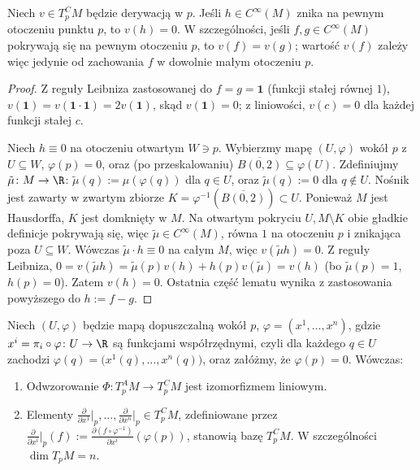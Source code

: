 \begin{lemat}\label{lem:lokalnosc}
Niech $v\in T_p^CM$ będzie derywacją w $p$. Jeśli $h\in C^\infty(M)$ znika na pewnym
otoczeniu punktu $p$, to $v(h)=0$. W szczególności, jeśli $f,g\in C^\infty(M)$ pokrywają
się na pewnym otoczeniu $p$, to $v(f)=v(g)$; wartość $v(f)$ zależy więc jedynie od
zachowania $f$ w dowolnie małym otoczeniu $p$.
\end{lemat}
\begin{proof}
Z reguły Leibniza zastosowanej do $f=g=\mathbf1$ (funkcji stałej równej $1$),
$v(\mathbf1)=v(\mathbf1\cdot\mathbf1)=2v(\mathbf1)$, skąd $v(\mathbf1)=0$; z liniowości,
$v(c)=0$ dla każdej funkcji stałej $c$.

Niech $h\equiv0$ na otoczeniu otwartym $W\ni p$. Wybierzmy mapę $(U,\varphi)$ wokół $p$ z
$U\subseteq W$, $\varphi(p)=0$, oraz (po przeskalowaniu)
$\overline{B(0,2)}\subseteq\varphi(U)$.
Zdefiniujmy $\tilde\mu\colon M\to\R$: $\tilde\mu(q):=\mu(\varphi(q))$ dla $q\in U$, oraz
$\tilde\mu(q):=0$ dla $q\notin U$. Nośnik jest zawarty w zwartym
zbiorze $K=\varphi^{-1}(\overline{B(0,2)})\subset U$.
Ponieważ $M$ jest Hausdorffa, $K$ jest domknięty w $M$.
Na otwartym pokryciu $U, M\setminus K$ obie gładkie definicje
pokrywają się, więc $\tilde\mu\in C^\infty(M)$, równa $1$ na otoczeniu $p$ i znikająca poza
$U\subseteq W$. Wówczas $\tilde\mu\cdot h\equiv0$ na całym $M$, więc $v(\tilde\mu h)=0$.
Z reguły Leibniza, $0=v(\tilde\mu h)=\tilde\mu(p)v(h)+h(p)v(\tilde\mu)=v(h)$ (bo
$\tilde\mu(p)=1$, $h(p)=0$). Zatem $v(h)=0$. Ostatnia część lematu wynika z zastosowania
powyższego do $h:=f-g$.
\end{proof}

\begin{twierdzenie}\label{tw:baza-styczna}
Niech $(U,\varphi)$ będzie mapą dopuszczalną wokół $p$,
$\varphi=(x^1,\dots,x^n)$,
gdzie $x^i=\pi_i\circ\varphi\colon U\to\R$ są funkcjami współrzędnymi,
czyli dla każdego $q\in U$ zachodzi
$\varphi(q)=\bigl(x^1(q),\dots,x^n(q)\bigr)$,
oraz załóżmy, że $\varphi(p)=0$. Wówczas:
\begin{enumerate}[label=(\alph*)]
\item Odwzorowanie $\Phi\colon T_p^AM\to T_p^CM$ jest izomorfizmem liniowym.
\item Elementy $\frac{\partial}{\partial x^1}\big|_p,\dots,\frac{\partial}{\partial x^n}
\big|_p\in T_p^CM$, zdefiniowane przez $\frac{\partial}{\partial x^i}\big|_p(f):=
\frac{\partial(f\circ\varphi^{-1})}{\partial x^i}(\varphi(p))$, stanowią bazę $T_p^CM$.
W szczególności $\dim T_pM=n$.
\end{enumerate}
\end{twierdzenie}

